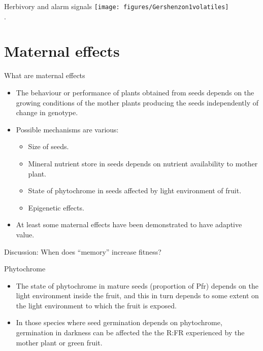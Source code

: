 \documentclass[10pt]{beamer}
\begin{document}
\begin{frame}{Herbivory and alarm signals}
    \centering
    \texttt{[image: figures/Gershenzon1volatiles]}\\
    {\small \autocite[from][]{Gershenzon2007}.}
\end{frame}


\section{Maternal effects}

\begin{frame}{What are maternal effects}
    \begin{itemize}
        \item The behaviour or performance of plants obtained from seeds depends on the growing conditions of the mother plants producing the seeds independently of change in genotype.
        \item Possible mechanisms are various:
        \begin{itemize}
           \item Size of seeds.
           \item Mineral nutrient store in seeds depends on nutrient availability to mother plant.
           \item State of phytochrome in seeds affected by light environment of fruit.
           \item Epigenetic effects.
        \end{itemize}
        \item At least some maternal effects have been demonstrated to have adaptive value.
    \end{itemize}
    Discussion: When does ``memory'' increase fitness?
\end{frame}

\begin{frame}{Phytochrome}
    \begin{itemize}
        \item The state of phytochrome in mature seeds (proportion of Pfr) depends on the light environment inside the fruit, and this in turn depends to some extent on the light environment to which the fruit is exposed.
        \item In those species where seed germination depends on phytochrome, germination in darkness can be affected the the R:FR experienced by the mother plant or green fruit.
    \end{itemize}
\end{frame}
\end{document}
